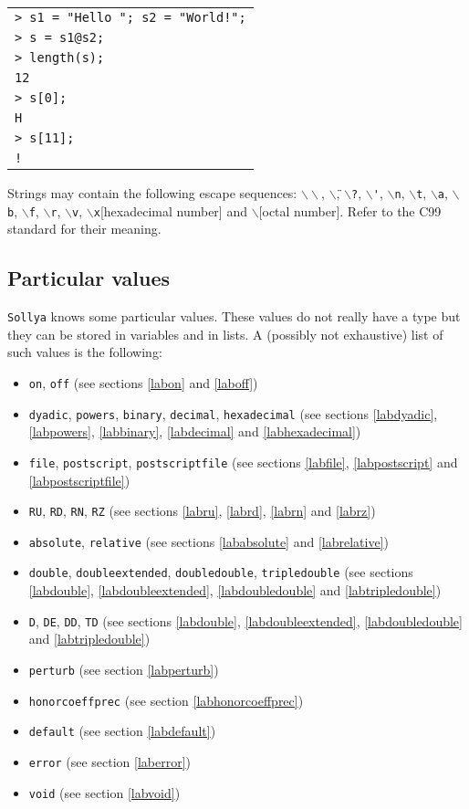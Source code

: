 \documentclass[a4paper]{article}
\newcommand{\com}[1]{\texttt{#1}}
\newcommand{\sollya}{\texttt{Sollya}\xspace}
\newcommand{\code}[1]{
\begin{center}
\begin{tabular}{|p{14.8cm}|}
\hline
#1
\hline
\end{tabular}
\end{center}
}
\newcommand{\ligne}[1]{\texttt{#1}\\}
\begin{document}
\code{
\ligne{> s1 = "Hello "; s2 = "World!";}
\ligne{> s = s1@s2;}
\ligne{> length(s);}
\ligne{12}
\ligne{> s[0];}
\ligne{H}
\ligne{> s[11];}
\ligne{!}
}

Strings may contain the following escape sequences:
\texttt{$\backslash\backslash$}, \texttt{$\backslash$\"},
\texttt{$\backslash$?}, \texttt{$\backslash$\'},
\texttt{$\backslash$n}, \texttt{$\backslash$t},
\texttt{$\backslash$a}, \texttt{$\backslash$b},
\texttt{$\backslash$f}, \texttt{$\backslash$r},
\texttt{$\backslash$v}, \texttt{$\backslash$x}[hexadecimal number] and
\texttt{$\backslash$}[octal number]. Refer to the C99 standard for their
meaning.

\subsection{Particular values}
\sollya knows some particular values. These values do not really have a type but they can be stored in variables and in lists. A (possibly not exhaustive) list of such values is the following:

\begin{itemize}
\item \com{on}, \com{off} (see sections \ref{labon} and \ref{laboff})
\item \com{dyadic}, \com{powers}, \com{binary}, \com{decimal}, \com{hexadecimal} (see sections \ref{labdyadic}, \ref{labpowers}, \ref{labbinary}, \ref{labdecimal} and \ref{labhexadecimal})
\item \com{file}, \com{postscript}, \com{postscriptfile} (see sections \ref{labfile}, \ref{labpostscript} and \ref{labpostscriptfile})
\item \com{RU}, \com{RD}, \com{RN}, \com{RZ} (see sections \ref{labru}, \ref{labrd}, \ref{labrn} and \ref{labrz})
\item \com{absolute}, \com{relative} (see sections \ref{lababsolute} and \ref{labrelative})
\item \com{double}, \com{doubleextended}, \com{doubledouble}, \com{tripledouble} (see sections \ref{labdouble}, \ref{labdoubleextended}, \ref{labdoubledouble} and \ref{labtripledouble})
\item \com{D}, \com{DE}, \com{DD}, \com{TD} (see sections \ref{labdouble}, \ref{labdoubleextended}, \ref{labdoubledouble} and \ref{labtripledouble})
\item \com{perturb} (see section \ref{labperturb})
\item \com{honorcoeffprec} (see section \ref{labhonorcoeffprec})
\item \com{default} (see section \ref{labdefault})
\item \com{error} (see section \ref{laberror})
\item \com{void} (see section \ref{labvoid})
\end{itemize}
\end{document}
